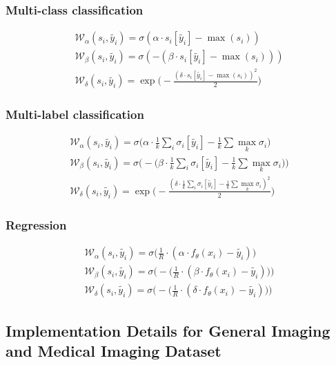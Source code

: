 \documentclass{article}
\theoremstyle{plain}
\theoremstyle{definition}
\theoremstyle{remark}
\begin{document}
\subsubsection{Multi-class classification}
\begin{align}
    \mathcal{W}_\alpha (s_i, \widetilde{y_i}) = \sigma(\alpha \cdot s_i[\widetilde{y_i}] - \max(s_i))\\
    \mathcal{W}_\beta (s_i, \widetilde{y_i}) = \sigma(-(\beta \cdot s_i[\widetilde{y_i}] - \max(s_i)))\\
    \mathcal{W}_\delta (s_i, \widetilde{y_i}) = \exp\biggl(-\frac{(\delta \cdot s_i[\widetilde{y_i}] - \max(s_i))^2}{2}\biggr)
\end{align}
\subsubsection{Multi-label classification}
\begin{align}
    \mathcal{W}_\alpha (s_i, \widetilde{y_i}) = \sigma\biggl(\alpha \cdot \frac{1}{k}\sum_i \sigma_i[\widetilde{y_i}] - \frac{1}{k}\sum\max_k{\sigma_i}\biggr)\\
    \mathcal{W}_\beta (s_i, \widetilde{y_i}) = \sigma\biggl(-\biggl(\beta \cdot \frac{1}{k}\sum_i \sigma_i[\widetilde{y_i}] - \frac{1}{k}\sum\max_k{\sigma_i}\biggr)\biggr)\\
    \mathcal{W}_\delta (s_i, \widetilde{y_i}) = \exp\biggl(-\frac{(\delta \cdot \frac{1}{k}\sum_i \sigma_i[\widetilde{y_i}] - \frac{1}{k}\sum\max_k{\sigma_i})^2}{2}\biggr)
\end{align}
\subsubsection{Regression}
\begin{align}
    \mathcal{W}_\alpha (s_i, \widetilde{y_i}) = \sigma\biggl(\frac{1}{R}\cdot (\alpha \cdot f_{\theta}(x_i) - \widetilde{y_i})\biggr)\\
    \mathcal{W}_\beta (s_i, \widetilde{y_i}) = \sigma\biggl(-\biggl(\frac{1}{R}\cdot (\beta \cdot f_{\theta}(x_i) - \widetilde{y_i})\biggr)\biggr)\\
    \mathcal{W}_\delta (s_i, \widetilde{y_i}) = \sigma\biggl(-\biggl(\frac{1}{R}\cdot (\delta \cdot f_{\theta}(x_i) - \widetilde{y_i})\biggr)\biggr)
\end{align}

\subsection{Implementation Details for General Imaging and Medical Imaging Dataset}
\label{imp}
\end{document}
